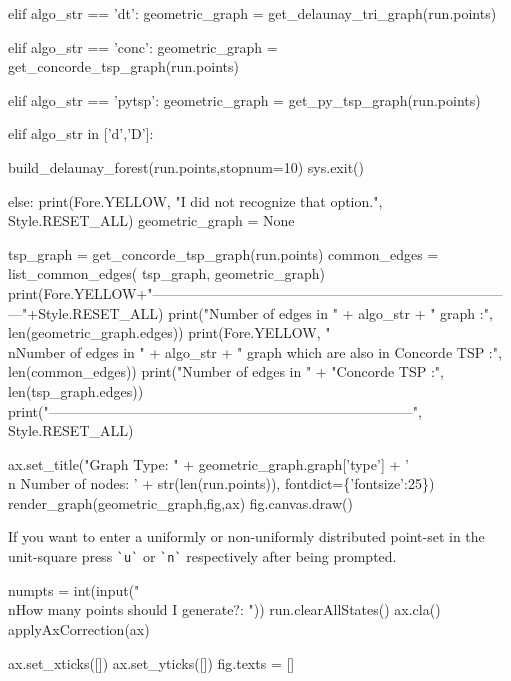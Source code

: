 elif algo_str == 'dt':
      geometric_graph = get_delaunay_tri_graph(run.points)

elif algo_str == 'conc':
     geometric_graph = get_concorde_tsp_graph(run.points)

elif algo_str == 'pytsp':
     geometric_graph = get_py_tsp_graph(run.points)

elif algo_str in ['d','D']:

     build_delaunay_forest(run.points,stopnum=10) 
     sys.exit()

else:
      print(Fore.YELLOW, "I did not recognize that option.", Style.RESET_ALL)
      geometric_graph = None

tsp_graph = get_concorde_tsp_graph(run.points)
common_edges = list_common_edges( tsp_graph, geometric_graph)
print(Fore.YELLOW+"------------------------------------------------------------------------------"+Style.RESET_ALL)
print("Number of edges in " + algo_str + " graph                                :", len(geometric_graph.edges))
print(Fore.YELLOW, "\\nNumber of edges in " + algo_str + " graph which are also in Concorde TSP :", len(common_edges))
print("Number of edges in " + "Concorde TSP                              :", len(tsp_graph.edges))
print("------------------------------------------------------------------------------", Style.RESET_ALL)


ax.set_title("Graph Type: " + geometric_graph.graph['type'] + '\\n Number of nodes: ' + str(len(run.points)), fontdict=\{'fontsize':25\})
render_graph(geometric_graph,fig,ax)
fig.canvas.draw()
\nwendcode{}\nwdocspar

If you want to enter a uniformly or non-uniformly distributed point-set in the unit-square press \verb|`u`| or \verb|`n`|
respectively after being prompted. 

\nwenddocs{}\endmoddef\nwstartdeflinemarkup{}\nwenddeflinemarkup
numpts = int(input("\\nHow many points should I generate?: ")) 
run.clearAllStates()
ax.cla()
applyAxCorrection(ax)

ax.set_xticks([])
ax.set_yticks([])
fig.texts = []
                 
